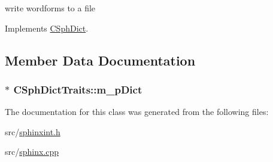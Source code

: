 write wordforms to a file 



Implements \hyperlink{classCSphDict_af490ff06f000637b7cb3ce5660ac1cba}{C\-Sph\-Dict}.



\subsection{Member Data Documentation}
\hypertarget{classCSphDictTraits_a69bd0effa15e9a57fc8c3433b4d75f8c}{
\subsubsection[{m\-\_\-p\-Dict}]{$\ast$ C\-Sph\-Dict\-Traits\-::m\-\_\-p\-Dict\hspace{0.3cm}{\ttfamily [protected]}}}\label{classCSphDictTraits_a69bd0effa15e9a57fc8c3433b4d75f8c}


The documentation for this class was generated from the following files\-:\begin{DoxyCompactItemize}
\item 
src/\hyperlink{sphinxint_8h}{sphinxint.\-h}\item 
src/\hyperlink{sphinx_8cpp}{sphinx.\-cpp}\end{DoxyCompactItemize}
